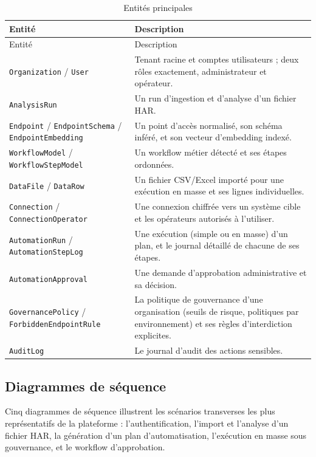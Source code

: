 \begin{longtable}{L{3.2cm}Y}
  \caption{Entités principales} \label{tab:entites-principales} \\
  Entité & Description \\
  \hline
  \endfirsthead
  Entité & Description \\
  \hline
  \endhead
  \texttt{Organization} / \texttt{User} & Tenant racine et comptes utilisateurs ; deux rôles exactement, administrateur et opérateur. \\ \hline
  \texttt{AnalysisRun} & Un run d'ingestion et d'analyse d'un fichier HAR. \\ \hline
  \texttt{Endpoint} / \texttt{EndpointSchema} / \texttt{EndpointEmbedding} & Un point d'accès normalisé, son schéma inféré, et son vecteur d'embedding indexé. \\ \hline
  \texttt{WorkflowModel} / \texttt{WorkflowStepModel} & Un workflow métier détecté et ses étapes ordonnées. \\ \hline
  \texttt{DataFile} / \texttt{DataRow} & Un fichier CSV/Excel importé pour une exécution en masse et ses lignes individuelles. \\ \hline
  \texttt{Connection} / \texttt{ConnectionOperator} & Une connexion chiffrée vers un système cible et les opérateurs autorisés à l'utiliser. \\ \hline
  \texttt{AutomationRun} / \texttt{AutomationStepLog} & Une exécution (simple ou en masse) d'un plan, et le journal détaillé de chacune de ses étapes. \\ \hline
  \texttt{AutomationApproval} & Une demande d'approbation administrative et sa décision. \\ \hline
  \texttt{GovernancePolicy} / \texttt{ForbiddenEndpointRule} & La politique de gouvernance d'une organisation (seuils de risque, politiques par environnement) et ses règles d'interdiction explicites. \\ \hline
  \texttt{AuditLog} & Le journal d'audit des actions sensibles. \\ \hline
\end{longtable}

\subsection{Diagrammes de séquence}

Cinq diagrammes de séquence illustrent les scénarios transverses les plus représentatifs de la plateforme : l'authentification, l'import et l'analyse d'un fichier HAR, la génération d'un plan d'automatisation, l'exécution en masse sous gouvernance, et le workflow d'approbation.

